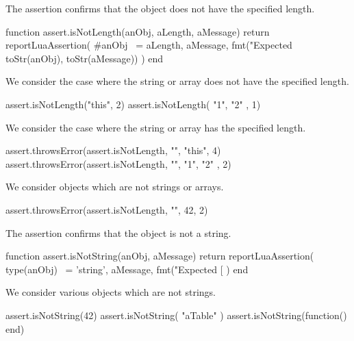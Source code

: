 
The  assertion confirms that the object does not 
have the specified length. 

\startLuaCode
function assert.isNotLength(anObj, aLength, aMessage)
  return reportLuaAssertion(
    #anObj ~= aLength,
    aMessage,
    fmt("Expected %
      toStr(anObj), toStr(aMessage))
  )
end
\stopLuaCode


We consider the case where the string or array does not have the specified 
length.

\startLuaTest
  assert.isNotLength("this", 2)
  assert.isNotLength({ "1", "2" }, 1)
\stopLuaTest
\stopTestCase


We consider the case where the string or array has the specified length. 

\startLuaTest
  assert.throwsError(assert.isNotLength, "", "this", 4)
  assert.throwsError(assert.isNotLength, "", { "1", "2" }, 2)
\stopLuaTest
\stopTestCase


We consider objects which are not strings or arrays.

\startLuaTest
  assert.throwsError(assert.isNotLength, "", 42, 2)
\stopLuaTest
\stopTestCase

\stopTestSuite


The  assertion confirms that the object is not a 
string. 

\startLuaCode
function assert.isNotString(anObj, aMessage)
  return reportLuaAssertion(
    type(anObj) ~= 'string',
    aMessage,
    fmt("Expected [%
  )
end
\stopLuaCode


We consider various objects which are not strings.

\startLuaTest
  assert.isNotString(42)
  assert.isNotString({ "aTable" })
  assert.isNotString(function() end)
\stopLuaTest
\stopTestCase


